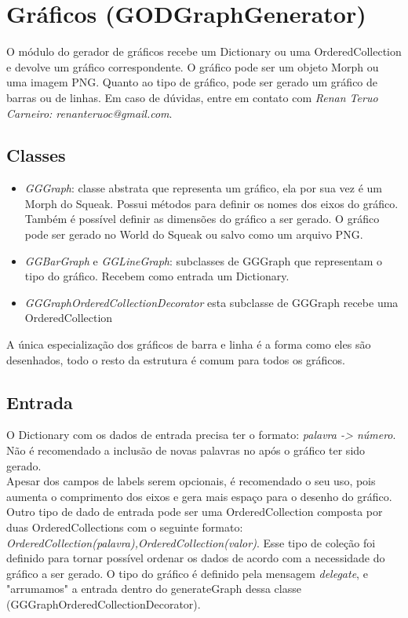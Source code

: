 \section{Gráficos (GODGraphGenerator)}
	O módulo do gerador de gráficos recebe um Dictionary ou uma OrderedCollection e devolve um gráfico correspondente. O gráfico pode ser um objeto Morph ou uma imagem PNG. Quanto ao tipo de gráfico, pode ser gerado um gráfico de barras ou de linhas. Em caso de dúvidas, entre em contato com \emph{Renan Teruo Carneiro: renanteruoc@gmail.com}.
	
	\subsection{Classes}
		\begin{itemize}
		    \item \emph{GGGraph}: classe abstrata que representa um gráfico, ela por sua vez é um Morph do Squeak. Possui métodos para definir os nomes dos eixos do gráfico. Também é possível definir as dimensões do gráfico a ser gerado. O gráfico pode ser gerado no World do Squeak ou salvo como um arquivo PNG.
		    \item \emph{GGBarGraph} e \emph{GGLineGraph}: subclasses de GGGraph que representam o tipo do gráfico. Recebem como entrada um Dictionary.
		    \item \emph{GGGraphOrderedCollectionDecorator} esta subclasse de GGGraph recebe uma OrderedCollection\\
		\end{itemize}
		A única especialização dos gráficos de barra e linha é a forma como eles são desenhados, todo o
		resto da estrutura é comum para todos os gráficos.\\
	
	\subsection{Entrada}
		
		O Dictionary com os dados de entrada precisa ter o formato: \emph{palavra -> número}. Não é recomendado a inclusão de novas palavras no após o
		gráfico ter sido gerado.\\

		Apesar dos campos de labels serem opcionais, é recomendado o seu uso, pois aumenta o comprimento dos eixos e gera mais espaço para o desenho do gráfico.\\

		Outro tipo de dado de entrada pode ser uma OrderedCollection composta por duas OrderedCollections com o seguinte formato: \emph{OrderedCollection(palavra),OrderedCollection(valor)}. Esse tipo de coleção foi definido para tornar possível ordenar os dados de acordo com a necessidade do gráfico a ser gerado. O tipo do gráfico é definido pela mensagem \emph{delegate}, e "arrumamos" a entrada dentro do generateGraph dessa classe (GGGraphOrderedCollectionDecorator).

